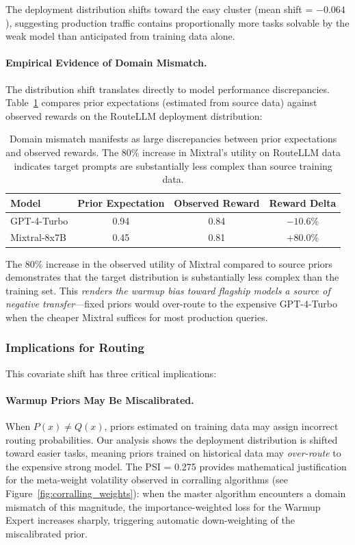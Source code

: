 \noindent The deployment distribution shifts toward the easy cluster (mean shift = $-0.064$), suggesting production traffic contains proportionally more tasks solvable by the weak model than anticipated from training data alone.

\paragraph{Empirical Evidence of Domain Mismatch.} The distribution shift translates directly to model performance discrepancies. Table~\ref{tab:domain_mismatch} compares prior expectations (estimated from source data) against observed rewards on the RouteLLM deployment distribution:

\begin{table}[h]
\centering
\small
\begin{tabular}{lccc}
\toprule
\textbf{Model} & \textbf{Prior Expectation} & \textbf{Observed Reward} & \textbf{Reward Delta} \\
\midrule
GPT-4-Turbo & 0.94 & 0.84 & $-10.6\%$ \\
Mixtral-8x7B & 0.45 & 0.81 & $+80.0\%$ \\
\bottomrule
\end{tabular}
\caption{Domain mismatch manifests as large discrepancies between prior expectations and observed rewards. The 80\% increase in Mixtral's utility on RouteLLM data indicates target prompts are substantially less complex than source training data.}
\label{tab:domain_mismatch}
\end{table}

\noindent The 80\% increase in the observed utility of Mixtral compared to source priors demonstrates that the target distribution is substantially less complex than the training set. This \emph{renders the warmup bias toward flagship models a source of negative transfer}---fixed priors would over-route to the expensive GPT-4-Turbo when the cheaper Mixtral suffices for most production queries.

\subsubsection{Implications for Routing}

This covariate shift has three critical implications:

\paragraph{Warmup Priors May Be Miscalibrated.} When $P(x) \neq Q(x)$, priors estimated on training data may assign incorrect routing probabilities. Our analysis shows the deployment distribution is shifted toward easier tasks, meaning priors trained on historical data may \emph{over-route} to the expensive strong model. The PSI = 0.275 provides mathematical justification for the meta-weight volatility observed in corralling algorithms (see Figure~\ref{fig:corralling_weights}): when the master algorithm encounters a domain mismatch of this magnitude, the importance-weighted loss for the Warmup Expert increases sharply, triggering automatic down-weighting of the miscalibrated prior.

